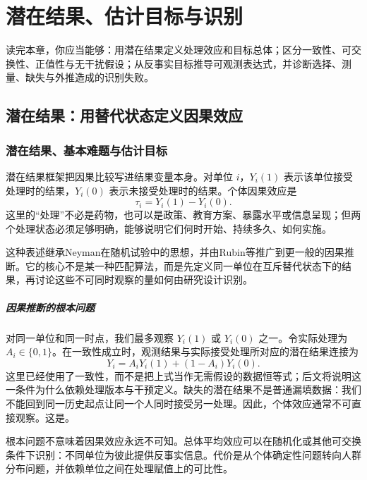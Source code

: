 \chapter{潜在结果、估计目标与识别}
\label{ch:potential-identification}

\begin{learninggoals}
读完本章，你应当能够：用潜在结果定义处理效应和目标总体；区分一致性、可交换性、正值性与无干扰假设；从反事实目标推导可观测表达式，并诊断选择、测量、缺失与外推造成的识别失败。
\end{learninggoals}

\section{潜在结果：用替代状态定义因果效应}

\subsection{潜在结果、基本难题与估计目标}

潜在结果框架把因果比较写进结果变量本身。对单位 $i$，$Y_i(1)$ 表示该单位接受处理时的结果，$Y_i(0)$ 表示未接受处理时的结果。个体因果效应是
\[
\tau_i=Y_i(1)-Y_i(0).
\]
这里的“处理”不必是药物，也可以是政策、教育方案、暴露水平或信息呈现；但两个处理状态必须足够明确，能够说明它们何时开始、持续多久、如何实施。

这种表述继承Neyman在随机试验中的思想，并由Rubin等推广到更一般的因果推断\parencite{neyman1923,rubin1974,holland1986}。它的核心不是某一种匹配算法，而是先定义同一单位在互斥替代状态下的结果，再讨论这些不可同时观察的量如何由研究设计识别。

\paragraph{因果推断的根本问题}

对同一单位和同一时点，我们最多观察 $Y_i(1)$ 或 $Y_i(0)$ 之一。令实际处理为 $A_i\in\{0,1\}$。在一致性成立时，观测结果与实际接受处理所对应的潜在结果连接为
\[
Y_i=A_iY_i(1)+(1-A_i)Y_i(0).
\]
这里已经使用了一致性，而不是把上式当作无需假设的数据恒等式；后文将说明这一条件为什么依赖处理版本与干预定义。缺失的潜在结果不是普通漏填数据：我们不能回到同一历史起点让同一个人同时接受另一处理。因此，个体效应通常不可直接观察。这是。

根本问题不意味着因果效应永远不可知。总体平均效应可以在随机化或其他可交换条件下识别：不同单位为彼此提供反事实信息。代价是从个体确定性问题转向人群分布问题，并依赖单位之间在处理赋值上的可比性。

